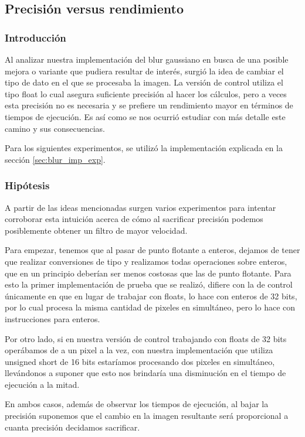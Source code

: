 \subsection{Precisión versus rendimiento}
\label{subsec:resultados2}

\subsubsection{Introducción}

Al analizar nuestra implementación del blur gaussiano en busca de una posible
mejora o variante que pudiera resultar de interés, surgió la idea de cambiar el
tipo de dato en el que se procesaba la imagen. La versión de control utiliza
el tipo float lo cual asegura suficiente precisión al hacer los cálculos, pero a
veces esta precisión no es necesaria y se prefiere un rendimiento mayor en
términos de tiempos de ejecución. Es así como se nos ocurrió estudiar con más
detalle este camino y sus consecuencias.

Para los siguientes experimentos, se utilizó la implementación explicada en la
sección \ref{sec:blur_imp_exp}.

\subsubsection{Hipótesis}

A partir de las ideas mencionadas surgen varios experimentos para intentar
corroborar esta intuición acerca de cómo al sacrificar precisión podemos
posiblemente obtener un filtro de mayor velocidad.

Para empezar, tenemos que al pasar de punto flotante a enteros, dejamos de
tener que realizar conversiones de tipo y realizamos todas operaciones sobre
enteros, que en un principio deberían ser menos costosas que las de punto
flotante. Para esto la primer implementación de prueba que se realizó, difiere
con la de control únicamente en que en lugar de trabajar con floats, lo hace con
enteros de 32 bits, por lo cual procesa la misma cantidad de pixeles en
simultáneo, pero lo hace con instrucciones para enteros.

Por otro lado, si en nuestra versión de control trabajando con floats de 32 bits
operábamos de a un pixel a la vez, con nuestra implementación que utiliza
unsigned short de 16 bits estaríamos procesando dos pixeles en
simultáneo, llevándonos a suponer que esto nos brindaría una disminución en el
tiempo de ejecución a la mitad.

En ambos casos, además de observar los tiempos de ejecución, al bajar la
precisión suponemos que el cambio en la imagen resultante será proporcional a
cuanta precisión decidamos sacrificar.


